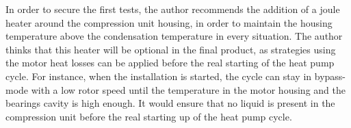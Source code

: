 In order to secure the first tests, the author recommends the addition
of a joule heater around the compression unit housing, in order to
maintain the housing temperature above the condensation temperature in
every situation. The author thinks that this heater will be optional
in the final product, as strategies using the motor heat losses can be
applied before the real starting of the heat pump cycle. For instance,
when the installation is started, the cycle can stay in bypass-mode
with a low rotor speed until the temperature in the motor
housing and the bearings cavity is high enough. It would ensure that
no liquid is present in the compression unit before the real starting
up of the heat pump cycle.

\FloatBarrier


\label{sec:cp-intg-refs}
